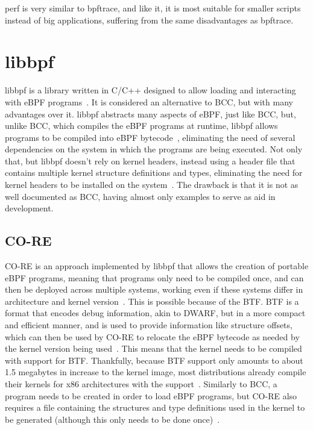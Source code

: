 perf is very similar to bpftrace, and like it, it is most suitable for smaller
scripts instead of big applications, suffering from the same disadvantages as
bpftrace.


\section{libbpf}

libbpf is a library written in C/C++ designed to allow loading and interacting
with eBPF programs~\cite{libbpf}. It is considered an alternative to \ac{BCC},
but with many advantages over it. libbpf abstracts many aspects of eBPF, just
like \ac{BCC}, but, unlike \ac{BCC}, which compiles the eBPF programs at
runtime, libbpf allows programs to be compiled into eBPF
bytecode~\cite{libbpf,contain}, eliminating the need of several dependencies on
the system in which the programs are being executed. Not only that, but libbpf
doesn't rely on kernel headers, instead using a header file that contains
multiple kernel structure definitions and types, eliminating the need for kernel
headers to be installed on the system~\cite{contain}. The drawback is that it is
not as well documented as \ac{BCC}, having almost only examples to serve as aid
in development.


\subsection{CO-RE}

\ac{CO-RE} is an approach implemented by libbpf that allows the creation of
portable eBPF programs, meaning that programs only need to be compiled once, and
can then be deployed across multiple systems, working even if these systems
differ in architecture and kernel version~\cite{coreref,fbslide}. This is
possible because of the \ac{BTF}. \ac{BTF} is a format that encodes debug
information, akin to \ac{DWARF}, but in a more compact and efficient manner, and
is used to provide information like structure offsets, which can then be used by
\ac{CO-RE} to relocate the eBPF bytecode as needed by the kernel version being
used~\cite{core}. This means that the kernel needs to be compiled with support
for \ac{BTF}. Thankfully, because \ac{BTF} support only amounts to about 1.5
megabytes in increase to the kernel image, most distributions already compile
their kernels for x86 architectures with the support~\cite{toolsfuture}.
Similarly to \ac{BCC}, a program needs to be created in order to load eBPF
programs, but \ac{CO-RE} also requires a file containing the structures and type
definitions used in the kernel to be generated (although this only needs to be
done once)~\cite{bootstrap}.

